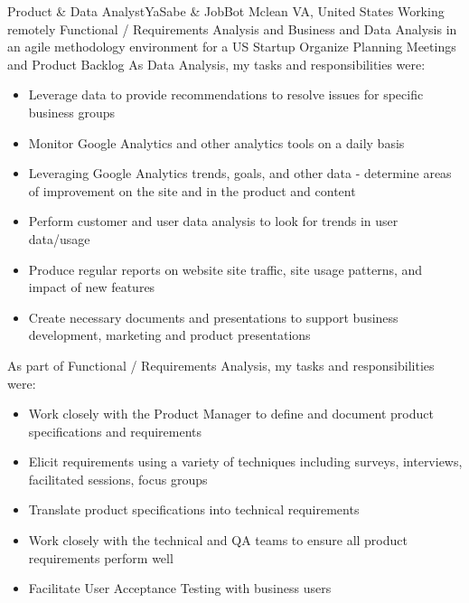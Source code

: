 \documentclass[11pt,a4paper,sans]{moderncv}
\begin{document}
 {Product \& Data Analyst}{YaSabe \& JobBot  }{Mclean VA,  United States \- Working remotely}{}
{
Functional / Requirements Analysis and Business and Data Analysis in an agile methodology environment for a US Startup
  \newline{}
Organize Planning Meetings and Product Backlog
  \newline{}
}
{
  As  Data Analysis, my tasks and responsibilities were:
}
\begin{itemize}
  \item Leverage data to provide recommendations to resolve issues for specific business groups
  \item Monitor Google Analytics and other analytics tools on a daily basis
  \item Leveraging Google Analytics trends, goals, and other data - determine areas of improvement on the site and in the product and content
  \item Perform customer and user data analysis to look for trends in user data/usage
  \item Produce regular reports on website site traffic, site usage patterns, and impact of new features
  \item Create necessary documents and presentations to support business development, marketing and product presentations
 \newline{}
 \end{itemize}
{
  As part of  Functional / Requirements Analysis, my tasks and responsibilities were:
}
\begin{itemize}
  \item Work closely with the Product Manager to define and document product specifications and requirements
  \item Elicit requirements using a variety of techniques including surveys, interviews, facilitated sessions, focus groups
  \item Translate product specifications into technical requirements
  \item Work closely with the technical and QA teams to ensure all product requirements perform well
  \item Facilitate User Acceptance Testing with business users
 \newline{}
\end{itemize}
\end{document}
